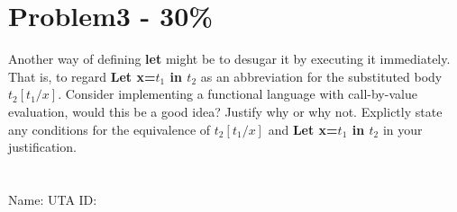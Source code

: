 \documentclass{article}
\newcommand{\answerboxbig}{
    \vspace{20cm} %
}
\newcommand{\studentinfo}{
    \noindent Name: \underline{\hspace{5cm}} UTA ID: \underline{\hspace{5cm}}\\
    \vspace{0.5cm} %
}
\begin{document}
\section*{Problem3 - 30\%}

Another way of defining \textbf{let} might be to desugar it by executing it immediately. That is, to regard \textbf{Let x=$t_1$ in $t_2$} as an abbreviation for the substituted body \textbf{$t_2[t_1/x]$}. Consider implementing a functional language with call-by-value evaluation, would this be a good idea? Justify why or why not. Explictly state any conditions for the equivalence of \textbf{$t_2[t_1/x]$} and \textbf{Let x=$t_1$ in $t_2$} in your justification.

\section*{}
\answerboxbig

\studentinfo
\end{document}
